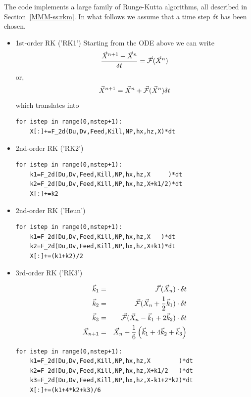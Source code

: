 The code implements a large family of Runge-Kutta algorithms, all described in 
Section~\ref{MMM-ss:rkm}.
In what follows we assume that a time step $\delta t$ has been chosen. 

\begin{itemize}

\item 1st-order RK ('RK1')
Starting from the ODE above we can write
\[
\frac{\vec{X}^{n+1} -\vec{X}^{n} }{\delta t} = \vec{\cal F} (\vec{X}^n)
\]
or, 
\[
\vec{X}^{n+1}
=
\vec{X}^{n} + \vec{\cal F} (\vec{X}^n) \delta t
\]
which translates into
\begin{lstlisting}
for istep in range(0,nstep+1):
    X[:]+=F_2d(Du,Dv,Feed,Kill,NP,hx,hz,X)*dt
\end{lstlisting}

\item 2nd-order RK ('RK2')
\begin{lstlisting}
for istep in range(0,nstep+1):
    k1=F_2d(Du,Dv,Feed,Kill,NP,hx,hz,X     )*dt
    k2=F_2d(Du,Dv,Feed,Kill,NP,hx,hz,X+k1/2)*dt
    X[:]+=k2
\end{lstlisting}

\item 2nd-order RK ('Heun')

\begin{lstlisting}
for istep in range(0,nstep+1):
    k1=F_2d(Du,Dv,Feed,Kill,NP,hx,hz,X   )*dt
    k2=F_2d(Du,Dv,Feed,Kill,NP,hx,hz,X+k1)*dt
    X[:]+=(k1+k2)/2
\end{lstlisting}



\item 3rd-order RK ('RK3')

\begin{eqnarray}
\vec{k}_1 &=& \vec{\cal F}(\vec{X}_n) \cdot \delta t\nonumber\\
\vec{k}_2 &=& \vec{\cal F}(\vec{X}_n+ \frac{1}{2} \vec{k}_1) \cdot \delta t \nonumber\\
\vec{k}_3 &=& \vec{\cal F}(\vec{X}_n -\vec{k}_1 +2\vec{k}_2) \cdot \delta t \nonumber\\
\vec{X}_{n+1} &=& \vec{X}_n + \frac{1}{6}\left(\vec{k}_1 + 4\vec{k}_2 + \vec{k}_3 \right)
\end{eqnarray}

\begin{lstlisting}
for istep in range(0,nstep+1):
    k1=F_2d(Du,Dv,Feed,Kill,NP,hx,hz,X        )*dt
    k2=F_2d(Du,Dv,Feed,Kill,NP,hx,hz,X+k1/2   )*dt
    k3=F_2d(Du,Dv,Feed,Kill,NP,hx,hz,X-k1+2*k2)*dt
    X[:]+=(k1+4*k2+k3)/6
\end{lstlisting}



\end{itemize}
